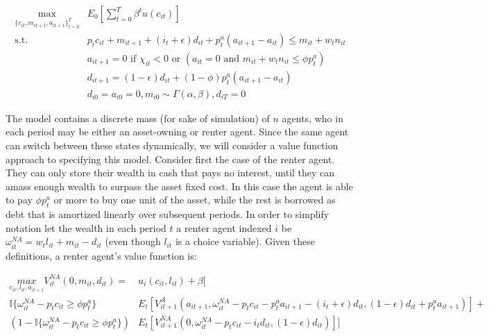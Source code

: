 \documentclass{article}
\begin{document}
\begin{align}
  \underset{\{c_{it}, m_{it+1}, a_{it+1}\}_{t=0}^T}{\max} &E_0\left[\sum^T_{t=0} \beta^t u(c_{it}) \right] \nonumber \\
  \text{s.t. }&p_t c_{it} + m_{it+1} + (i_t + \epsilon) d_{it} + p^a_t (a_{it+1} - a_{it}) \leq m_{it} + w_t n_{it} \nonumber \\
  &a_{it+1} = 0 \text{ if } \chi_{it} < 0 \text{ or } (a_{it} = 0 \text{ and } m_{it} + w_t n_{it} \leq \phi p^a_t) \nonumber \\
  &d_{it+1} = (1 - \epsilon) d_{it} + (1 - \phi) p^a_t (a_{it+1} - a_{it}) \nonumber \\
  &d_{i0} = a_{i0} = 0, m_{i0} \sim \Gamma(\alpha, \beta), d_{iT} = 0
\end{align}

The model contains a discrete mass (for sake of simulation) of $n$ agents, who in each period may be either an asset-owning or renter agent. Since the same agent can switch between these states dynamically, we will consider a value function approach to specifying this model. Consider first the case of the renter agent. They can only store their wealth in cash that pays no interest, until they can amass enough wealth to surpass the asset fixed cost. In this case the agent is able to pay $\phi p^a_t$ or more to buy one unit of the asset, while the rest is borrowed as debt that is amortized linearly over subsequent periods. In order to simplify notation let the wealth in each period $t$ a renter agent indexed $i$ be $\omega^{NA}_{it} = w_t l_{it} + m_{it} - d_{it}$ (even though $l_{it}$ is a choice variable). Given these definitions, a renter agent's value function is:

\begin{align}
  \underset{c_{it}, l_{it}, a_{it+1}}{max} V^{NA}_{it}(0, m_{it}, d_{it}) = &u_{i}(c_{it}, l_{it}) + \beta [ \nonumber \\ 
  \mathbb{I}\{\omega^{NA}_{it} - p_t c_{it} \geq \phi p_t^a \} &E_t[V^A_{it+1}(a_{it+1}, \omega^{NA}_{it} - p_t c_{it} - p^a_t a_{it+1} - (i_t + \epsilon) d_{it}, (1 - \epsilon) d_{it} + p^a_t a_{it+1})] + \nonumber \\ 
  \left(1 - \mathbb{I}\{\omega^{NA}_{it} - p_t c_{it} \geq \phi p_t^a \} \right) &E_t[V^{NA}_{it+1}(0, \omega^{NA}_{it} - p_t c_{it} - i_t d_{it}, (1 - \epsilon) d_{it})]]\label{vna}
\end{align}
\end{document}
